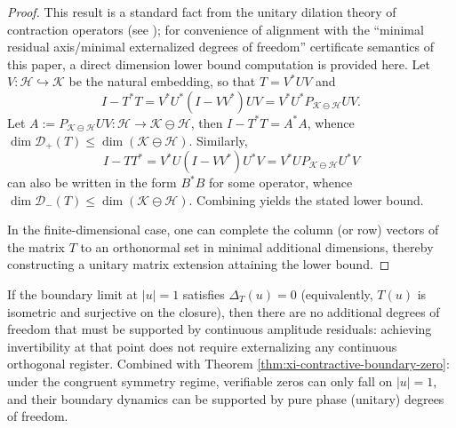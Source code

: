 \begin{proof}
This result is a standard fact from the unitary dilation theory of contraction operators (see \cite{SzNagyFoias1970HarmonicAnalysis}); for convenience of alignment with the ``minimal residual axis/minimal externalized degrees of freedom'' certificate semantics of this paper, a direct dimension lower bound computation is provided here.
Let \(V:\mathcal{H}\hookrightarrow\mathcal{K}\) be the natural embedding, so that \(T=V^{*}UV\) and
\[
I-T^{*}T
=V^{*}U^{*}(I-VV^{*})UV
=V^{*}U^{*}P_{\mathcal{K}\ominus\mathcal{H}}UV.
\]
Let \(A:=P_{\mathcal{K}\ominus\mathcal{H}}UV:\mathcal{H}\to\mathcal{K}\ominus\mathcal{H}\), then \(I-T^{*}T=A^{*}A\), whence
\(
\dim\mathcal{D}_{+}(T)\le \dim(\mathcal{K}\ominus\mathcal{H})
\).
Similarly,
\[
I-TT^{*}
=V^{*}U(I-VV^{*})U^{*}V
=V^{*}UP_{\mathcal{K}\ominus\mathcal{H}}U^{*}V
\]
can also be written in the form \(B^{*}B\) for some operator, whence
\(
\dim\mathcal{D}_{-}(T)\le \dim(\mathcal{K}\ominus\mathcal{H})
\).
Combining yields the stated lower bound.
\par
In the finite-dimensional case, one can complete the column (or row) vectors of the matrix \(T\) to an orthonormal set in minimal additional dimensions, thereby constructing a unitary matrix extension attaining the lower bound. \qedhere
\end{proof}

\begin{corollary}\label{cor:xi-defect-vanishing-boundary}
If the boundary limit at \(|u|=1\) satisfies \(\Delta_T(u)=0\) (equivalently, \(T(u)\) is isometric and surjective on the closure), then there are no additional degrees of freedom that must be supported by continuous amplitude residuals: achieving invertibility at that point does not require externalizing any continuous orthogonal register.
Combined with Theorem \ref{thm:xi-contractive-boundary-zero}: under the congruent symmetry regime, verifiable zeros can only fall on \(|u|=1\), and their boundary dynamics can be supported by pure phase (unitary) degrees of freedom.
\end{corollary}

